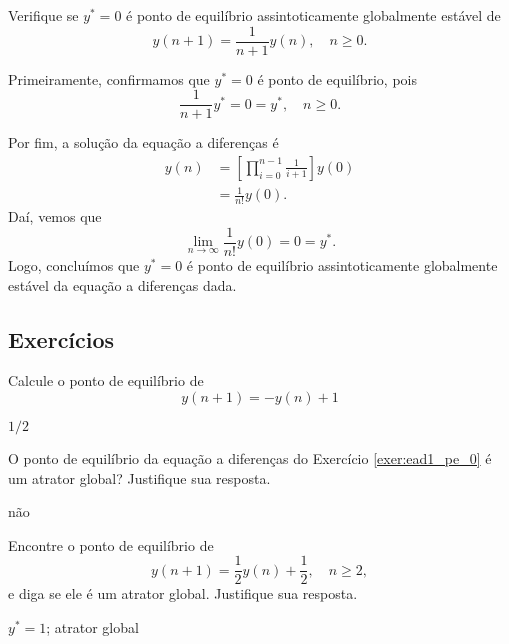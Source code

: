 \begin{exeresol}
  Verifique se $y^*=0$ é ponto de equilíbrio assintoticamente globalmente estável de
  \begin{equation}
    y(n+1) = \frac{1}{n+1}y(n),\quad n\geq 0.
  \end{equation}
\end{exeresol}
\begin{resol}
  Primeiramente, confirmamos que $y^* = 0$ é ponto de equilíbrio, pois
  \begin{equation}
    \frac{1}{n+1}y^* = 0 = y^*,\quad n\geq 0.
  \end{equation}

  Por fim, a solução da equação a diferenças é
  \begin{align}
    y(n) &= \left[\prod_{i=0}^{n-1}\frac{1}{i+1}\right]y(0)\\
         &= \frac{1}{n!}y(0).
  \end{align}
  Daí, vemos que
  \begin{equation}
    \lim_{n\to\infty} \frac{1}{n!}y(0) = 0 = y^*.
  \end{equation}
  Logo, concluímos que $y^*=0$ é ponto de equilíbrio assintoticamente globalmente estável da equação a diferenças dada. 
\end{resol}

\subsection*{Exercícios}

\begin{exer}\label{exer:ead1_pe_0}
  Calcule o ponto de equilíbrio de
  \begin{equation}
    y(n+1) = -y(n) + 1 
  \end{equation}
\end{exer}
\begin{resp}
  $1/2$
\end{resp}

\begin{exer}
  O ponto de equilíbrio da equação a diferenças do Exercício \ref{exer:ead1_pe_0} é um atrator global? Justifique sua resposta.
\end{exer}
\begin{resp}
  não
\end{resp}

\begin{exer}
  Encontre o ponto de equilíbrio de
  \begin{equation}
    y(n+1) = \frac{1}{2}y(n) + \frac{1}{2},\quad n\geq 2,
  \end{equation}
  e diga se ele é um atrator global. Justifique sua resposta.
\end{exer}
\begin{resp}
  $y^*=1$; atrator global
\end{resp}

